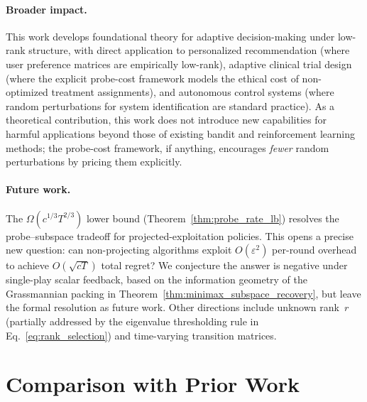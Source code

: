 \documentclass{article}
\begin{document}
\paragraph{Broader impact.}
This work develops foundational theory for adaptive decision-making under low-rank structure, with direct application to personalized recommendation (where user preference matrices are empirically low-rank), adaptive clinical trial design (where the explicit probe-cost framework models the ethical cost of non-optimized treatment assignments), and autonomous control systems (where random perturbations for system identification are standard practice).
As a theoretical contribution, this work does not introduce new capabilities for harmful applications beyond those of existing bandit and reinforcement learning methods; the probe-cost framework, if anything, encourages \emph{fewer} random perturbations by pricing them explicitly.

\paragraph{Future work.}
The $\Omega(c^{1/3}T^{2/3})$ lower bound (Theorem~\ref{thm:probe_rate_lb}) resolves the probe--subspace tradeoff for projected-exploitation policies. This opens a precise new question: can non-projecting algorithms exploit $O(\varepsilon^2)$ per-round overhead to achieve $O(\sqrt{cT})$ total regret? We conjecture the answer is negative under single-play scalar feedback, based on the information geometry of the Grassmannian packing in Theorem~\ref{thm:minimax_subspace_recovery}, but leave the formal resolution as future work. Other directions include unknown rank~$r$ (partially addressed by the eigenvalue thresholding rule in Eq.~\eqref{eq:rank_selection}) and time-varying transition matrices.


\section{Comparison with Prior Work}
\label{app:related_table}
\end{document}
